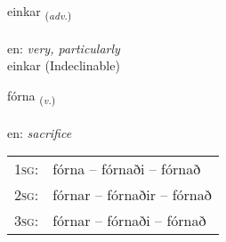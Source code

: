 \documentclass[frontgrid, backgrid]{flacards}\usepackage[]{graphicx}\usepackage[]{xcolor}
\begin{document}

\renewcommand{\flhead}{\vskip5pt \fboxsep=0pt {\small\bfseries\footnotesize Atviksorð | Adverb}}
\renewcommand{\fcfoot}{\vskip5pt \fboxsep=0pt \hspace{2pt}{\small\bfseries\footnotesize 3K}}

\renewcommand{\blhead}{\vskip5pt {\small\bfseries\footnotesize Atviksorð | Adverb }}
\renewcommand{\bcfoot}{\vskip5pt \hspace{2pt}{\small\bfseries\footnotesize 3K}}


{einkar \small{\textsubscript{(\textit{adv.})}} \\[1ex]
 \\
en: \emph{very, particularly} \\  [2ex]
einkar (Indeclinable)}

\renewcommand{\flhead}{\vskip5pt \fboxsep=0pt {\small\bfseries\footnotesize Sagnorð | Verb}}
\renewcommand{\fcfoot}{\vskip5pt \fboxsep=0pt \hspace{2pt}{\small\bfseries\footnotesize 3K}}

\renewcommand{\blhead}{\vskip5pt {\small\bfseries\footnotesize Sagnorð | Verb }}
\renewcommand{\bcfoot}{\vskip5pt \hspace{2pt}{\small\bfseries\footnotesize 3K}}


{fórna \small{\textsubscript{(\textit{v.})}} \\[1ex] %
\textphonetic{[fourtna]} \\
en: \emph{sacrifice} \\  [2ex]
\renewcommand*{\arraystretch}{0.8}
\begin{tabular}{p{1cm}l}
\textsc{1sg}: & fórna -- fórnaði -- fórnað \\ 
\textsc{2sg}: & fórnar -- fórnaðir -- fórnað \\ 
\textsc{3sg}: & fórnar -- fórnaði -- fórnað \\ 
\end{tabular}
}
\end{document}
